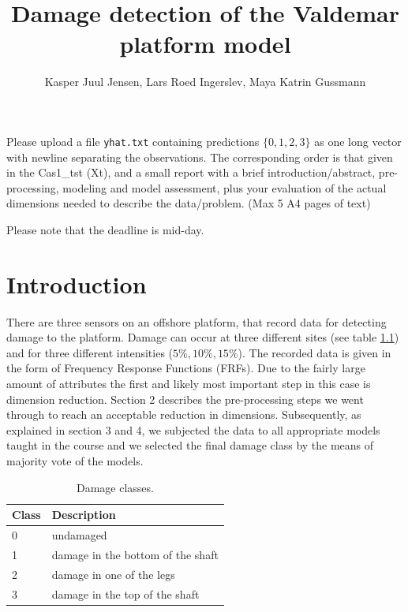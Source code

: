 \documentclass[a4paper,draft=false]{scrreprt}\usepackage[]{graphicx}\usepackage[]{color}
\title{Damage detection of the Valdemar platform model}
\author{Kasper Juul Jensen, Lars Roed Ingerslev, Maya Katrin Gussmann}
\begin{document}
\maketitle



Please upload a file \verb+yhat.txt+ containing predictions $\lbrace 0, 1, 2, 3\rbrace$ as one long vector with newline separating the observations. The corresponding order is that given in the \mbox{Cas1\_tst} (Xt), and a small report with a brief introduction/abstract, pre-processing, modeling and model assessment, plus your evaluation of the actual dimensions needed to describe the data/problem. (Max 5	A4 pages of text)

Please note that the deadline is mid-day.

\chapter{Introduction} %

There are three sensors on an offshore platform, that record data for detecting damage to the platform. Damage can occur at three different sites (see table \ref{table:damageclass}) and for three different intensities ($5\%, 10\%, 15\%$). The recorded data is given in the form of Frequency Response Functions (FRFs).
Due to the fairly large amount of attributes the first and likely most important step in this case is dimension reduction. Section 2 describes the pre-processing steps we went through to reach an acceptable reduction in dimensions. Subsequently, as explained in section 3 and 4, we subjected the data to all appropriate models taught in the course and we selected the final damage class by the means of majority vote of the models.   

\begin{table}[ht]
\begin{center}
\begin{tabular}{ll}
  \hline
  Class & Description\\\hline
  0 & undamaged\\
  1 & damage in the bottom of the shaft\\
  2 & damage in one of the legs\\
  3 & damage in the top of the shaft\\
  \hline
\end{tabular}
\caption{Damage classes.\label{table:damageclass}}
\end{center}
\end{table}
\end{document}

